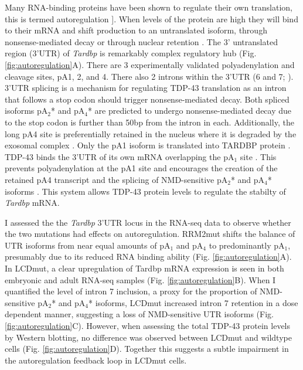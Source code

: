 Many RNA-binding proteins have been shown to regulate their own translation, this is termed autoregulation \citep{Lareau2007,Wollerton2004}]. 
When levels of the protein are high they will bind to their mRNA and shift production to an untranslated isoform, through nonsense-mediated decay or through nuclear retention \citep{McGlincy2008-wh,Boutz2015}.
The 3' untranslated region (3'UTR) of \textit{Tardbp} is remarkably complex regulatory hub (Fig. \ref{fig:autoregulation}A). 
There are 3 experimentally validated polyadenylation and cleavage sites, pA1, 2, and 4. 
There also 2 introns within the 3'UTR (6 and 7; \citep{Ayala2011,Koyama2016}). 
3'UTR splicing is a mechanism for regulating TDP-43 translation as an intron that follows a stop codon should trigger nonsense-mediated decay. 
Both spliced isoforms pA$_2$* and pA$_4$* are predicted to undergo nonsense-mediated decay due to the stop codon is further than 50bp from the intron in each.
Additionally, the long pA4 site is preferentially retained in the nucleus where it is degraded by the exosomal complex \citep{Ayala2011}.
Only the pA1 isoform is translated into TARDBP protein \citep{Koyama2016}.
TDP-43 binds the 3'UTR of its own mRNA overlapping the pA$_1$ site  \citep{Polymenidou2011,Tollervey2011}.
This prevents polyadenylation at the pA1 site and encourages the creation of the retained pA4 transcript and the splicing of NMD-sensitive pA$_2$* and pA$_4$* isoforms \citep{Koyama2016}. 
This system allows TDP-43 protein levels to regulate the stabilty of \textit{Tardbp} mRNA.

I assessed the the \textit{Tardbp} 3'UTR locus in the RNA-seq data to observe whether the two mutations had effects on autoregulation. 
RRM2mut shifts the balance of UTR isoforms from near equal amounts of pA$_1$ and pA$_4$ to predominantly pA$_1$, presumably due to its reduced RNA binding ability  (Fig. \ref{fig:autoregulation}A).  
In LCDmut, a clear upregulation of Tardbp mRNA expression is seen in both embryonic and adult RNA-seq samples (Fig. \ref{fig:autoregulation}B). 
When I quantified the level of intron 7 inclusion,  a proxy for the proportion of NMD-sensitive pA$_2$* and pA$_4$* isoforms, LCDmut increased intron 7 retention in a dose dependent manner, suggesting a loss of NMD-sensitive UTR isoforms (Fig. \ref{fig:autoregulation}C). 
However, when assessing the total TDP-43 protein levels by Western blotting, no difference was observed between LCDmut and wildtype cells (Fig. \ref{fig:autoregulation}D).
Together this suggests a subtle impairment in the autoregulation feedback loop in LCDmut cells.

